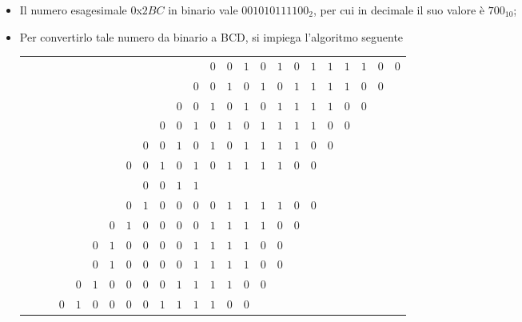 \documentclass[a4paper]{extarticle}
\renewcommand\arraystretch{}
\begin{document}
\begin{itemize}
    \item Il numero esagesimale $0$x$2BC$ in binario vale $0010 1011 1100_{2}$, per cui in decimale il suo valore è $700_{10}$;
    \item Per convertirlo tale numero da binario a BCD, si impiega l'algoritmo seguente
    \noindent
    \begin{table}[H]
        \setlength{\tabcolsep}{4pt}
        \renewcommand{\arraystretch}{1}
        \centering
        \begin{tabular}{|cccc|cccc|cccc|cccccccccccc}
            &&&&&&&&&&&&$0$&$0$&$1$&$0$&$1$&$0$&$1$&$1$&$1$&$1$&$0$&$0$\\
            &&&&&&&&&&&$0$&$0$&$1$&$0$&$1$&$0$&$1$&$1$&$1$&$1$&$0$&$0$&\\
            &&&&&&&&&&$0$&$0$&$1$&$0$&$1$&$0$&$1$&$1$&$1$&$1$&$0$&$0$&&\\
            &&&&&&&&&$0$&$0$&$1$&$0$&$1$&$0$&$1$&$1$&$1$&$1$&$0$&$0$&&&\\
            &&&&&&&&$0$&$0$&$1$&$0$&$1$&$0$&$1$&$1$&$1$&$1$&$0$&$0$&&&&\\
            &&&&&&&$0$&\cellcolor{cyan!25!white}$0$&\cellcolor{cyan!25!white}$1$&\cellcolor{cyan!25!white}$0$&\cellcolor{cyan!25!white}$1$&$0$&$1$&$1$&$1$&$1$&$0$&$0$&&&&\\
            &&&&&&&&\cellcolor{cyan!25!white}$0$\cellcolor{cyan!25!white}&\cellcolor{cyan!25!white}$0$&\cellcolor{cyan!25!white}$1$&\cellcolor{cyan!25!white}$1$&&&&&&&&&&&&\\
    
            &&&&&&&$0$&$1$&$0$&$0$&$0$&$0$&$1$&$1$&$1$&$1$&$0$&$0$&&&&&\\
            &&&&&&$0$&$1$&$0$&$0$&$0$&$0$&$1$&$1$&$1$&$1$&$0$&$0$&&&&&&\\
            &&&&&$0$&$1$&$0$&$0$&$0$&$0$&$1$&$1$&$1$&$1$&$0$&$0$&&&&&&&\\
            &&&&&$0$&$1$&$0$&$0$&$0$&$0$&$1$&$1$&$1$&$1$&$0$&$0$&&&&&&&\\
            &&&&$0$&$1$&$0$&$0$&$0$&$0$&$1$&$1$&$1$&$1$&$0$&$0$&&&&&&&&\\
            &&&$0$&\cellcolor{cyan!25!white}$1$&\cellcolor{cyan!25!white}$0$&\cellcolor{cyan!25!white}$0$&\cellcolor{cyan!25!white}$0$&\cellcolor{cyan!25!white}$0$&\cellcolor{cyan!25!white}$1$&\cellcolor{cyan!25!white}$1$&\cellcolor{cyan!25!white}$1$&$1$&$0$&$0$&&&&&&&&&\\
    

\end{tabular}
\end{table}
\end{itemize}
\end{document}
